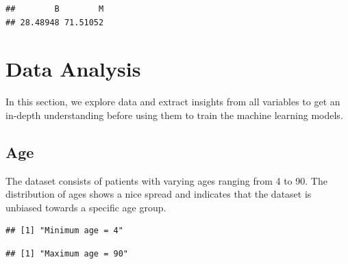 \documentclass[]{article}
\newenvironment{Shaded}{\begin{snugshade}}{\end{snugshade}}
\newcommand{\KeywordTok}[1]{\textcolor[rgb]{0.13,0.29,0.53}{\textbf{#1}}}
\newcommand{\NormalTok}[1]{#1}
\newcommand{\OperatorTok}[1]{\textcolor[rgb]{0.81,0.36,0.00}{\textbf{#1}}}
\newcommand{\StringTok}[1]{\textcolor[rgb]{0.31,0.60,0.02}{#1}}
\begin{document}
\begin{verbatim}
##        B        M 
## 28.48948 71.51052
\end{verbatim}

\section{Data Analysis}
\label{sec:dataanalysis}

In this section, we explore data and extract insights from all variables
to get an in-depth understanding before using them to train the machine
learning models.

\subsection{Age}

The dataset consists of patients with varying ages ranging from 4 to 90.
The distribution of ages shows a nice spread and indicates that the
dataset is unbiased towards a specific age group.

\begin{Shaded}
\end{Shaded}

\begin{verbatim}
## [1] "Minimum age = 4"
\end{verbatim}

\begin{Shaded}
\end{Shaded}

\begin{verbatim}
## [1] "Maximum age = 90"
\end{verbatim}
\end{document}
